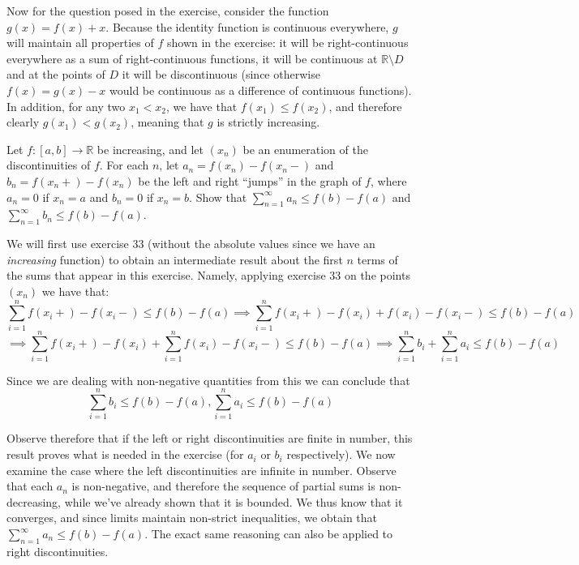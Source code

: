 \begin{solution}
    Now for the question posed in the exercise, consider the function $g(x) = f(x) + x$.
    Because the identity function is continuous everywhere, $g$ will maintain all properties of $f$ shown in the exercise: it will be right-continuous everywhere as a sum of right-continuous functions, it will be continuous at $\mathbb{R} \setminus D$ and at the points of $D$ it will be discontinuous (since otherwise $f(x) = g(x) - x$ would be continuous as a difference of continuous functions).
    In addition, for any two $x_1 < x_2$, we have that $f(x_1) \leq f(x_2)$, and therefore clearly $g(x_1) < g(x_2)$, meaning that $g$ is strictly increasing.
\end{solution}

\begin{exercise}{35}
    Let $f: [a, b] \rightarrow \mathbb{R}$ be increasing, and let $(x_n)$ be an enumeration of the discontinuities of $f$.
    For each $n$, let $a_n = f(x_n) - f(x_n-)$ and $b_n = f(x_n+) - f(x_n)$ be the left and right ``jumps'' in the graph of $f$, where $a_n = 0$ if $x_n = a$ and $b_n = 0$ if $x_n = b$.
    Show that $\sum_{n=1}^{\infty} a_n \leq f(b) - f(a)$ and $\sum_{n=1}^{\infty} b_n \leq f(b) - f(a)$.
\end{exercise}

\begin{solution}
    
    We will first use exercise 33 (without the absolute values since we have an \textit{increasing} function) to obtain an intermediate result about the first $n$ terms of the sums that appear in this exercise.
    Namely, applying exercise 33 on the points $(x_n)$ we have that:
    $$\sum_{i=1}^{n} f(x_i+) - f(x_i-) \leq f(b) - f(a) \implies \sum_{i=1}^{n} f(x_i+) - f(x_i) + f(x_i) - f(x_i-) \leq f(b) - f(a)$$
    $$\implies \sum_{i=1}^{n} f(x_i+) - f(x_i) + \sum_{i=1}^{n} f(x_i) - f(x_i-) \leq f(b) - f(a) \implies \sum_{i=1}^{n} b_i + \sum_{i=1}^{n} a_i \leq f(b) - f(a)$$

    Since we are dealing with non-negative quantities from this we can conclude that $$\sum_{i=1}^{n} b_i \leq f(b) - f(a), \sum_{i=1}^{n} a_i \leq f(b) - f(a)$$

    Observe therefore that if the left or right discontinuities are finite in number, this result proves what is needed in the exercise (for $a_i$ or $b_i$ respectively).
    We now examine the case where the left discontinuities are infinite in number.
    Observe that each $a_n$ is non-negative, and therefore the sequence of partial sums is non-decreasing, while we've already shown that it is bounded.
    We thus know that it converges, and since limits maintain non-strict inequalities, we obtain that $\sum_{n=1}^{\infty} a_n \leq f(b) - f(a)$.
    The exact same reasoning can also be applied to right discontinuities.
\end{solution}

